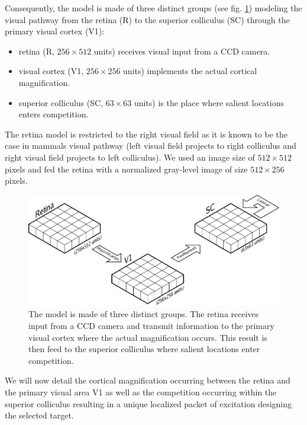 Consequently, the model is made of three distinct groups (see
fig. \ref{fig:model}) modeling the visual pathway from the retina (R)
to the superior colliculus (SC) through the primary visual cortex
(V1):
\begin{itemize}
  \item retina (R, $256\times 512$ units) receives visual input from a CCD
    camera.
  \item visual cortex (V1, $256\times 256$ units) implements the actual
    cortical magnification.
  \item superior colliculus (SC, $63\times 63$ units) is the place where
    salient locations enters competition.
\end{itemize}
The retina model is restricted to the right visual field as it is known to be
the case in mammals visual pathway (left visual field projects to right
colliculus and right visual field projects to left colliculus). We used an
image size of $512 \times 512$ pixels and fed the retina with a normalized
gray-level image of size $512 \times 256$ pixels.
\begin{figure} %
  \begin{center}
    \includegraphics[width=\textwidth]{Chapitres/PublicationsSample/Chapitre/figures/model}
  \end{center}
  \caption {The model is made of three distinct groups. The retina receives
    input from a CCD camera and transmit information to the primary visual
    cortex where the actual magnification occurs. This result is then feed to
    the superior colliculus where salient locations enter competition.}
  \label{fig:model}
\end{figure}
We will now detail the cortical magnification occurring between the retina and the
primary visual area V1 as well as the competition occurring within the superior
colliculus resulting in a unique localized packet of excitation designing the
selected target.

